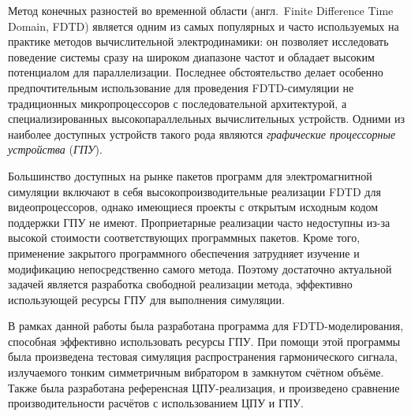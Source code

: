 
Метод конечных разностей во временной области (англ.~Finite Difference Time Domain, FDTD) является одним из самых популярных и часто используемых на практике методов вычислительной электродинамики: он позволяет исследовать поведение системы сразу на широком диапазоне частот и обладает высоким потенциалом для параллелизации. Последнее обстоятельство делает особенно предпочтительным использование для проведения FDTD-симуляции не традиционных микропроцессоров с последовательной архитектурой, а специализированных высокопараллельных вычислительных устройств. Одними из наиболее доступных устройств такого рода являются \textit{графические процессорные устройства} (\textit{ГПУ}).

Большинство доступных на рынке пакетов программ для электромагнитной симуляции включают в себя высокопроизводительные реализации FDTD для видеопроцессоров, однако имеющиеся проекты с открытым исходным кодом поддержки ГПУ не имеют. Проприетарные реализации часто недоступны из-за высокой стоимости соответствующих программных пакетов. Кроме того, применение закрытого программного обеспечения затрудняет изучение и модификацию непосредственно самого метода. Поэтому достаточно актуальной задачей является разработка свободной реализации метода, эффективно использующей ресурсы ГПУ для выполнения симуляции.

В рамках данной работы была разработана программа для FDTD-моделирования, способная эффективно использовать ресурсы ГПУ. При помощи этой программы была произведена тестовая симуляция распространения гармонического сигнала, излучаемого тонким симметричным вибратором в замкнутом счётном объёме. Также была разработана референсная ЦПУ-реализация, и произведено сравнение производительности расчётов с использованием ЦПУ и ГПУ.

\clearpage